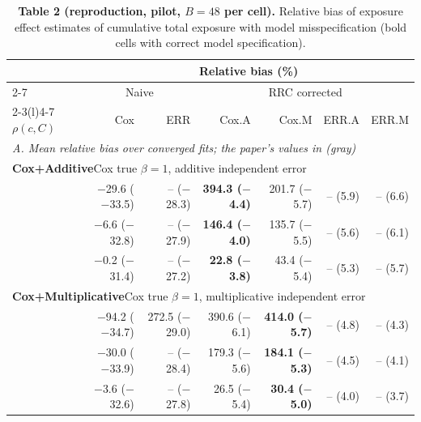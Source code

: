 \documentclass[10pt]{article}
\begin{document}
\begin{table}[ht]\centering\footnotesize
\begin{threeparttable}
\caption*{\textbf{Table 2 (reproduction, pilot, $B = 48$ per cell).} Relative bias of exposure effect estimates of cumulative total exposure with model misspecification (bold cells with correct model specification).}
\begin{tabular}{l rrrrrr}
\toprule
 & \multicolumn{6}{c}{Relative bias (\%)} \\
\cmidrule(l){2-7}
 & \multicolumn{2}{c}{Naive} & \multicolumn{4}{c}{RRC corrected} \\
\cmidrule(lr){2-3}\cmidrule(l){4-7}
$\rho(c, C)$ & Cox & ERR & Cox.A & Cox.M & ERR.A & ERR.M \\
\midrule
\multicolumn{7}{l}{\textit{A. Mean relative bias over converged fits; the paper's values in {\color{gray}(gray)}}} \\[2pt]
\multicolumn{7}{l}{\textbf{Cox+Additive}\quad Cox true $\beta = 1$, additive independent error} \\
\quad 0.3 & $-$29.6 {\color{gray}($-$33.5)} & -- {\color{gray}($-$28.3)} & \boldmath\textbf{394.3 {\color{gray}($-$4.4)}} & 201.7 {\color{gray}($-$5.7)} & -- {\color{gray}(5.9)} & -- {\color{gray}(6.6)} \\
\quad 0.6 & $-$6.6 {\color{gray}($-$32.8)} & -- {\color{gray}($-$27.9)} & \boldmath\textbf{146.4 {\color{gray}($-$4.0)}} & 135.7 {\color{gray}($-$5.5)} & -- {\color{gray}(5.6)} & -- {\color{gray}(6.1)} \\
\quad 0.9 & $-$0.2 {\color{gray}($-$31.4)} & -- {\color{gray}($-$27.2)} & \boldmath\textbf{22.8 {\color{gray}($-$3.8)}} & 43.4 {\color{gray}($-$5.4)} & -- {\color{gray}(5.3)} & -- {\color{gray}(5.7)} \\
\midrule
\multicolumn{7}{l}{\textbf{Cox+Multiplicative}\quad Cox true $\beta = 1$, multiplicative independent error} \\
\quad 0.3 & $-$94.2 {\color{gray}($-$34.7)} & 272.5 {\color{gray}($-$29.0)} & 390.6 {\color{gray}($-$6.1)} & \boldmath\textbf{414.0 {\color{gray}($-$5.7)}} & -- {\color{gray}(4.8)} & -- {\color{gray}(4.3)} \\
\quad 0.6 & $-$30.0 {\color{gray}($-$33.9)} & -- {\color{gray}($-$28.4)} & 179.3 {\color{gray}($-$5.6)} & \boldmath\textbf{184.1 {\color{gray}($-$5.3)}} & -- {\color{gray}(4.5)} & -- {\color{gray}(4.1)} \\
\quad 0.9 & $-$3.6 {\color{gray}($-$32.6)} & -- {\color{gray}($-$27.8)} & 26.5 {\color{gray}($-$5.4)} & \boldmath\textbf{30.4 {\color{gray}($-$5.0)}} & -- {\color{gray}(4.0)} & -- {\color{gray}(3.7)} \\

\end{tabular}
\end{threeparttable}
\end{table}
\end{document}
